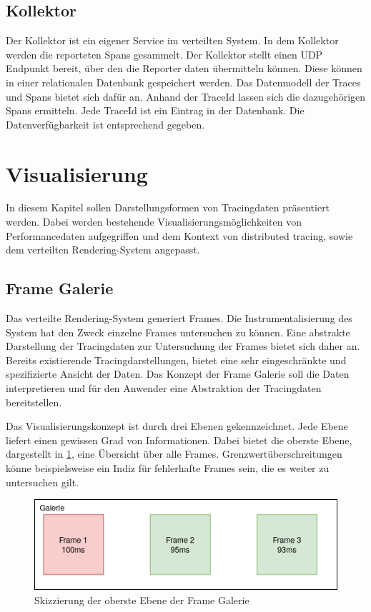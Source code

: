 \subsection{Kollektor}
\label{subsection:Kollektor}
Der Kollektor ist ein eigener Service im verteilten System. In dem Kollektor werden die reporteten Spans gesammelt. Der Kollektor stellt einen UDP Endpunkt bereit, über den die Reporter daten übermitteln können. Diese können in einer relationalen Datenbank gespeichert werden. Das Datenmodell der Traces und Spans bietet sich dafür an. Anhand der TraceId lassen sich die dazugehörigen Spans ermitteln. Jede TraceId ist ein Eintrag in der Datenbank. Die Datenverfügbarkeit ist entsprechend gegeben.  

\section{Visualisierung}
\label{section:Visualisierung}
In diesem Kapitel sollen Darstellungsformen von Tracingdaten präsentiert werden. Dabei werden bestehende Visualisierungsmöglichkeiten von Performancedaten aufgegriffen und dem Kontext von distributed tracing, sowie dem verteilten Rendering-System angepasst.


\subsection{Frame Galerie}
\label{subsection:Frame Galerie}
Das verteilte Rendering-System generiert Frames. Die Instrumentalisierung des System hat den Zweck einzelne Frames untersuchen zu können. Eine abstrakte Darstellung der Tracingdaten zur Untersuchung der Frames bietet sich daher an. Bereits existierende Tracingdarstellungen, bietet eine sehr eingeschränkte und spezifizierte Ansicht der Daten. Das Konzept der Frame Galerie soll die Daten interpretieren und für den Anwender eine Abstraktion der Tracingdaten bereitstellen. 

Das Visualisierungskonzept ist durch drei Ebenen gekennzeichnet. Jede Ebene liefert einen gewissen Grad von Informationen. Dabei bietet die oberste Ebene, dargestellt in \cref{fig:FrameGalerieObereEbene}, eine Übersicht über alle Frames. Grenzwertüberschreitungen könne beispielsweise ein Indiz für fehlerhafte Frames sein, die es weiter zu untersuchen gilt.

\begin{figure}[!ht]
	\centering
	\includegraphics[scale=0.8]{img/Design/FrameGalerieObereEbene.png}
	\caption[Oberste Ebene der Frame Galerie]{ Skizzierung der oberste Ebene der Frame Galerie}
	\label{fig:FrameGalerieObereEbene}
\end{figure}

